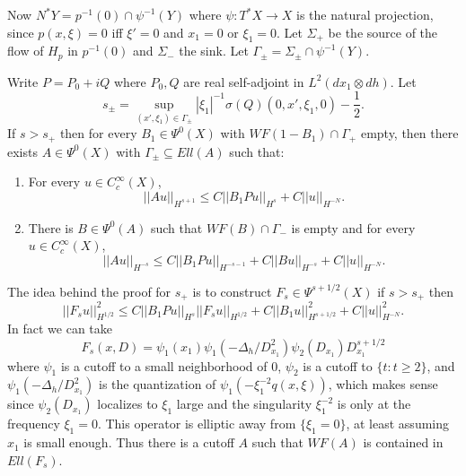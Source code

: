 \documentclass[12pt]{article}
\begin{document}
Now $N^*Y = p^{-1}(0) \cap \psi^{-1}(Y)$ where $\psi: T^*X \to X$ is the natural projection, since $p(x, \xi) = 0$ iff $\xi' = 0$ and $x_1 = 0$ or $\xi_1 = 0$.
Let $\Sigma_+$ be the source of the flow of $H_p$ in $p^{-1}(0)$ and $\Sigma_-$ the sink.
Let $\Gamma_\pm = \Sigma_\pm \cap \psi^{-1}(Y)$.

\begin{theorem}
Write $P = P_0 + iQ$ where $P_0,Q$ are real self-adjoint in $L^2(dx_1 \otimes dh)$.
Let
$$s_\pm = \sup_{(x', \xi_1) \in \Gamma_\pm} |\xi_1|^{-1} \sigma(Q)(0, x', \xi_1, 0) - \frac{1}{2}.$$
If $s > s_+$ then for every $B_1 \in \Psi^0(X)$ with $WF(1 - B_1) \cap \Gamma_+$ empty, then there exists $A \in \Psi^0(X)$ with $\Gamma_\pm \subseteq Ell(A)$ such that:
\begin{enumerate}
\item For every $u \in C^\infty_c(X)$,
$$||Au||_{H^{s+1}} \leq C||B_1Pu||_{H^s} + C||u||_{H^{-N}}.$$
\item There is $B \in \Psi^0(A)$ such that $WF(B) \cap \Gamma_-$ is empty and for every $u \in C^\infty_c(X)$,
$$||Au||_{H^{-s}} \leq C||B_1Pu||_{H^{-s-1}} + C||Bu||_{H^{-s}} + C||u||_{H^{-N}}.$$
\end{enumerate}
\end{theorem}

The idea behind the proof for $s_+$ is to construct $F_s \in \Psi^{s+1/2}(X)$ if $s > s_+$ then
$$||F_su||_{H^{1/2}}^2 \leq C||B_1Pu||_{H^s} ||F_su||_{H^{1/2}} + C||B_1u||_{H^{s+1/2}}^2 + C||u||_{H^{-N}}^2.$$
In fact we can take
$$F_s(x, D) = \psi_1(x_1) \psi_1(-\Delta_h/D_{x_1}^2) \psi_2(D_{x_1})D_{x_1}^{s+1/2}$$
where $\psi_1$ is a cutoff to a small neighborhood of $0$, $\psi_2$ is a cutoff to $\{t: t \geq 2\}$, and $\psi_1(-\Delta_h/D_{x_1}^2)$ is the quantization of $\psi_1(-\xi_1^{-2}q(x, \xi))$,
which makes sense since $\psi_2(D_{x_1})$ localizes to $\xi_1$ large and the singularity $\xi_1^{-2}$ is only at the frequency $\xi_1 = 0$.
This operator is elliptic away from $\{\xi_1 = 0\}$, at least assuming $x_1$ is small enough.
Thus there is a cutoff $A$ such that $WF(A)$ is contained in $Ell(F_s)$.
\end{document}
